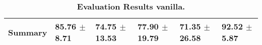 \begin{table}[htb]
{\begin{tabular}{llllll}
\midrule
\textbf{Summary                                  } &        \phantom{0}85.76 $\pm$ \phantom{0}8.71 &                      \phantom{0}74.75 $\pm$ 13.53 &                  \phantom{0}77.90 $\pm$ 19.79 &                  \phantom{0}71.35 $\pm$ 26.58 &  \phantom{0}92.52 $\pm$ \phantom{0}5.87 \\
\bottomrule
\end{tabular}%
}
\caption{\textbf{Evaluation Results vanilla.}}
\label{tab:eval-results}
\end{table}


